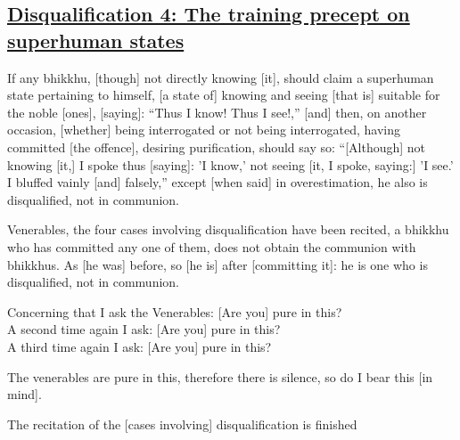\subsection*{\hyperref[par4]{Disqualification 4: The training precept on superhuman states}}
\label{disq4}
If any bhikkhu, [though] not directly knowing [it], should claim a superhuman state pertaining to himself, [a state of] knowing and seeing [that is] suitable for the noble [ones], [saying]: ``Thus I know! Thus I see!,'' [and] then, on another occasion, [whether] being interrogated or not being interrogated, having committed [the offence], desiring purification, should say so: ``[Although] not knowing [it,] I spoke thus [saying]: 'I know,' not seeing [it, I spoke, saying:] 'I see.' I bluffed vainly [and] falsely,'' except [when said] in overestimation, he also is disqualified, not in communion.

\medskip

\begin{center}
Venerables, the four cases involving disqualification have been recited, a bhikkhu who has committed any one of them, does not obtain the communion with bhikkhus. As [he was] before, so [he is] after [committing it]: he is one who is disqualified, not in communion.

\smallskip

Concerning that I ask the Venerables: [Are you] pure in this?\\
A second time again I ask: [Are you] pure in this?\\
A third time again I ask: [Are you] pure in this?

\smallskip

The venerables are pure in this, therefore there is silence, so do I bear this [in mind].
\end{center}

\begin{outro}
  The recitation of the [cases involving] disqualification is finished
\end{outro}

\clearpage
